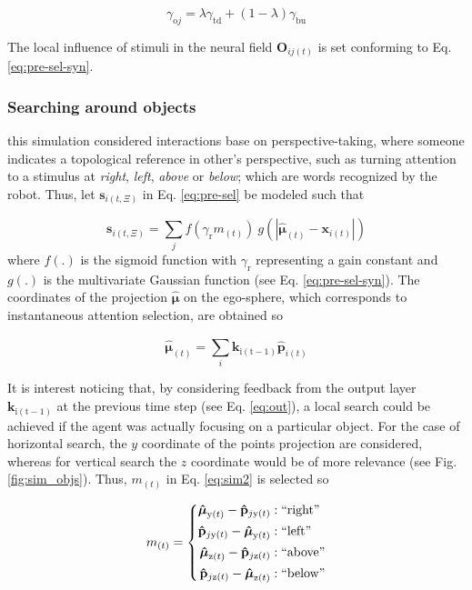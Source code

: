 \documentclass[letterpaper, 10 pt, conference]{ieeeconf}  %
\begin{document}
	 \begin{equation}
	 \gamma_{\mathrm{o}j} = \lambda\gamma_\mathrm{td}+ (1-\lambda)\gamma_\mathrm{bu}
	 \label{eq:sim1-step}
	 \end{equation}
	
	\noindent The local influence of stimuli in the neural field $\mathbf{O}_{ij(t)}$ is set conforming to Eq. \eqref{eq:pre-sel-syn}.
	
	\subsubsection{Searching around objects} this simulation considered interactions base on perspective-taking, where someone indicates a topological reference in other's perspective, such as turning attention to a stimulus at \textit{right}, \textit{left}, \textit{above} or \textit{below}; which are words recognized by the robot. Thus, let $\mathbf{s}_{i(t,\Xi)}$ in Eq. \eqref{eq:pre-sel} be modeled such that
	
	\begin{equation}
	\mathbf{s}_{i(t,\Xi)} = \sum_{j}^{} f\left(\gamma_\mathrm{r}m_{(t)}\right)\ g\left(\left|\boldsymbol{\hat{\mu}}_{(t)} - \mathbf{x}_{i(t)}\right|\right)
	\label{eq:sim2}
	\end{equation}
	\noindent where $f(.)$ is the sigmoid function with $\gamma_\mathrm{r}$ representing a gain constant and $g(.)$ is the multivariate Gaussian function (see Eq. \eqref{eq:pre-sel-syn}). The coordinates of the projection $\boldsymbol{\hat{\mu}}$ on the ego-sphere, which corresponds to instantaneous attention selection, are obtained so 
	
	\begin{equation}
	\boldsymbol{\hat{\mu}}_{(t)} = \sum_{i}^{}\mathbf{k}_\mathrm{i(t-1)}\mathbf{\hat{p}}_{i(t)}
	\label{eq:sim2-mu}
	\end{equation}
	
	It is interest noticing that, by considering feedback from the output layer $\mathbf{k}_\mathrm{i(t-1)}$ at the previous time step (see Eq. \eqref{eq:out}), a local search could be achieved if the agent was actually focusing on a particular object. For the case of horizontal search, the $y$ coordinate of the points projection are considered, whereas for vertical search the $z$ coordinate would be of more relevance (see Fig. \ref{fig:sim_objs}). Thus, $m_{(t)}$ in Eq. \eqref{eq:sim2} is selected so
	
	\begin{equation}
	m_{(t)} = 
	\left\{
	\begin{split}
	\boldsymbol{\hat{\mu}}_{\mathrm{y}(t)}- \mathbf{\hat{p}}_{j\mathrm{y}(t)} & : \mathrm{``right"}\\
	\mathbf{\hat{p}}_{j\mathrm{y}(t)} - \boldsymbol{\hat{\mu}}_{\mathrm{y}(t)}& : \mathrm{``left"}\\
	\boldsymbol{\hat{\mu}}_{\mathrm{z}(t)}- \mathbf{\hat{p}}_{j\mathrm{z}(t)} & : \mathrm{``above"}\\
	\mathbf{\hat{p}}_{j\mathrm{z}(t)} - \boldsymbol{\hat{\mu}}_{\mathrm{z}(t)} & : \mathrm{``below"}\\
	\end{split}\right.
	\label{eq:sim2-m}
	\end{equation}
	
\end{document}
